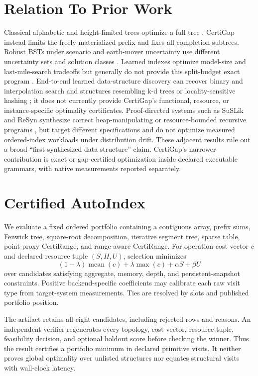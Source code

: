 \documentclass[10pt]{article}
\begin{document}
\section{Relation To Prior Work}
Classical alphabetic and height-limited trees optimize a full tree
\cite{hutucker1971,larmore1994}. CertiGap instead limits the freely
materialized prefix and fixes all completion subtrees. Robust BSTs under
scenario and earth-mover uncertainty use different uncertainty sets and
solution classes \cite{angelopoulos2025,dinitz2024}. Learned indexes optimize
model-size and last-mile-search tradeoffs but generally do not provide this
split-budget exact program \cite{pgm2020,sosd2020}.
End-to-end learned data-structure discovery can recover binary and
interpolation search and structures resembling k-d trees or locality-sensitive
hashing \cite{salemohamed2025}; it does not currently provide CertiGap's
functional, resource, or instance-specific optimality certificates.
Proof-directed systems such as SuSLik and ReSyn synthesize correct
heap-manipulating or resource-bounded recursive programs
\cite{polikarpova2019,knoth2019}, but target different specifications and do
not optimize measured ordered-index workloads under distribution drift.
These adjacent results rule out a broad ``first synthesized data structure''
claim. CertiGap's narrower contribution is exact or gap-certified optimization
inside declared executable grammars, with native measurements reported
separately.

\section{Certified AutoIndex}
We evaluate a fixed ordered portfolio containing a contiguous array, prefix
sums, Fenwick tree, square-root decomposition, iterative segment tree, sparse
table, point-proxy CertiRange, and range-aware CertiRange. For operation-cost
vector $c$ and declared resource tuple
$(S,H,U)$, selection minimizes
\[
(1-\lambda)\operatorname{mean}(c)+\lambda\max(c)
  +\alpha S+\beta U
\]
over candidates satisfying aggregate, memory, depth, and persistent-snapshot
constraints. Positive backend-specific coefficients may calibrate each raw
visit type from target-system measurements. Ties are resolved by slots and
published portfolio position.

The artifact retains all eight candidates, including rejected rows and reasons.
An independent verifier regenerates every topology, cost vector, resource
tuple, feasibility decision, and optional holdout score before checking the
winner. Thus the result certifies a portfolio minimum in declared primitive
visits. It neither proves global optimality over unlisted structures nor
equates structural visits with wall-clock latency.
\end{document}
